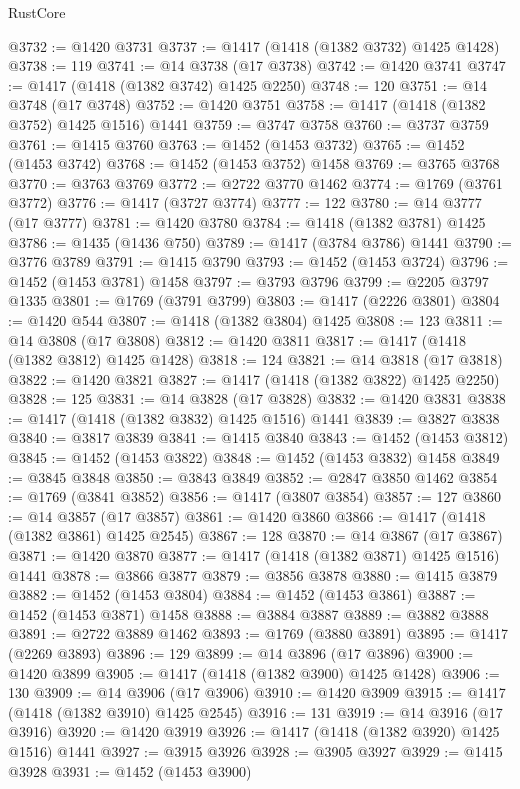 \begin{lexlean}{RustCore}
\begin{coremodule}
@3732 := @1420 @3731
@3737 := @1417 (@1418 (@1382 @3732) @1425 @1428)
@3738 := 119
@3741 := @14 @3738 (@17 @3738)
@3742 := @1420 @3741
@3747 := @1417 (@1418 (@1382 @3742) @1425 @2250)
@3748 := 120
@3751 := @14 @3748 (@17 @3748)
@3752 := @1420 @3751
@3758 := @1417 (@1418 (@1382 @3752) @1425 @1516) @1441
@3759 := @3747 @3758
@3760 := @3737 @3759
@3761 := @1415 @3760
@3763 := @1452 (@1453 @3732)
@3765 := @1452 (@1453 @3742)
@3768 := @1452 (@1453 @3752) @1458
@3769 := @3765 @3768
@3770 := @3763 @3769
@3772 := @2722 @3770 @1462
@3774 := @1769 (@3761 @3772)
@3776 := @1417 (@3727 @3774)
@3777 := 122
@3780 := @14 @3777 (@17 @3777)
@3781 := @1420 @3780
@3784 := @1418 (@1382 @3781) @1425
@3786 := @1435 (@1436 @750)
@3789 := @1417 (@3784 @3786) @1441
@3790 := @3776 @3789
@3791 := @1415 @3790
@3793 := @1452 (@1453 @3724)
@3796 := @1452 (@1453 @3781) @1458
@3797 := @3793 @3796
@3799 := @2205 @3797 @1335
@3801 := @1769 (@3791 @3799)
@3803 := @1417 (@2226 @3801)
@3804 := @1420 @544
@3807 := @1418 (@1382 @3804) @1425
@3808 := 123
@3811 := @14 @3808 (@17 @3808)
@3812 := @1420 @3811
@3817 := @1417 (@1418 (@1382 @3812) @1425 @1428)
@3818 := 124
@3821 := @14 @3818 (@17 @3818)
@3822 := @1420 @3821
@3827 := @1417 (@1418 (@1382 @3822) @1425 @2250)
@3828 := 125
@3831 := @14 @3828 (@17 @3828)
@3832 := @1420 @3831
@3838 := @1417 (@1418 (@1382 @3832) @1425 @1516) @1441
@3839 := @3827 @3838
@3840 := @3817 @3839
@3841 := @1415 @3840
@3843 := @1452 (@1453 @3812)
@3845 := @1452 (@1453 @3822)
@3848 := @1452 (@1453 @3832) @1458
@3849 := @3845 @3848
@3850 := @3843 @3849
@3852 := @2847 @3850 @1462
@3854 := @1769 (@3841 @3852)
@3856 := @1417 (@3807 @3854)
@3857 := 127
@3860 := @14 @3857 (@17 @3857)
@3861 := @1420 @3860
@3866 := @1417 (@1418 (@1382 @3861) @1425 @2545)
@3867 := 128
@3870 := @14 @3867 (@17 @3867)
@3871 := @1420 @3870
@3877 := @1417 (@1418 (@1382 @3871) @1425 @1516) @1441
@3878 := @3866 @3877
@3879 := @3856 @3878
@3880 := @1415 @3879
@3882 := @1452 (@1453 @3804)
@3884 := @1452 (@1453 @3861)
@3887 := @1452 (@1453 @3871) @1458
@3888 := @3884 @3887
@3889 := @3882 @3888
@3891 := @2722 @3889 @1462
@3893 := @1769 (@3880 @3891)
@3895 := @1417 (@2269 @3893)
@3896 := 129
@3899 := @14 @3896 (@17 @3896)
@3900 := @1420 @3899
@3905 := @1417 (@1418 (@1382 @3900) @1425 @1428)
@3906 := 130
@3909 := @14 @3906 (@17 @3906)
@3910 := @1420 @3909
@3915 := @1417 (@1418 (@1382 @3910) @1425 @2545)
@3916 := 131
@3919 := @14 @3916 (@17 @3916)
@3920 := @1420 @3919
@3926 := @1417 (@1418 (@1382 @3920) @1425 @1516) @1441
@3927 := @3915 @3926
@3928 := @3905 @3927
@3929 := @1415 @3928
@3931 := @1452 (@1453 @3900)

\end{coremodule}
\end{lexlean}
